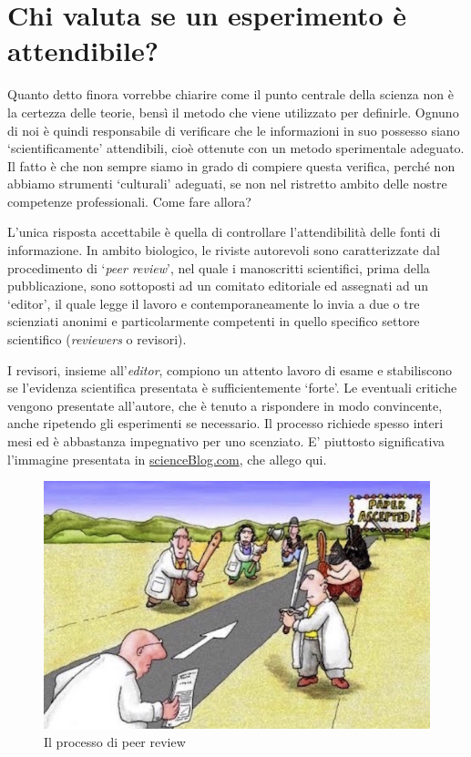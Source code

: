 \documentclass[a4paper,12pt,oneside]{book}
\begin{document}
\hypertarget{chi-valuta-se-un-esperimento-e-attendibile}{%
\section{Chi valuta se un esperimento è attendibile?}\label{chi-valuta-se-un-esperimento-e-attendibile}}

Quanto detto finora vorrebbe chiarire come il punto centrale della scienza non è la certezza delle teorie, bensì il metodo che viene utilizzato per definirle. Ognuno di noi è quindi responsabile di verificare che le informazioni in suo possesso siano `scientificamente' attendibili, cioè ottenute con un metodo sperimentale adeguato. Il fatto è che non sempre siamo in grado di compiere questa verifica, perché non abbiamo strumenti `culturali' adeguati, se non nel ristretto ambito delle nostre competenze professionali. Come fare allora?

L'unica risposta accettabile è quella di controllare l'attendibilità delle fonti di informazione. In ambito biologico, le riviste autorevoli sono caratterizzate dal procedimento di `\emph{peer review}', nel quale i manoscritti scientifici, prima della pubblicazione, sono sottoposti ad un comitato editoriale ed assegnati ad un `editor', il quale legge il lavoro e contemporaneamente lo invia a due o tre scienziati anonimi e particolarmente competenti in quello specifico settore scientifico (\emph{reviewers} o revisori).

I revisori, insieme all'\emph{editor}, compiono un attento lavoro di esame e stabiliscono se l'evidenza scientifica presentata è sufficientemente `forte'. Le eventuali critiche vengono presentate all'autore, che è tenuto a rispondere in modo convincente, anche ripetendo gli esperimenti se necessario. Il processo richiede spesso interi mesi ed è abbastanza impegnativo per uno scenziato. E' piuttosto significativa l'immagine presentata in \href{http://scienceblogs.com/startswithabang/2013/06/07/the-4-jobs-of-a-referee-in-peer-review/}{scienceBlog.com}, che allego qui.

\begin{figure}

{\centering \includegraphics[width=0.75\linewidth]{_images/PeerReview} 

}

\caption{Il processo di peer review}\label{fig:figName3}
\end{figure}
\end{document}

